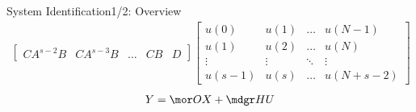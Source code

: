 \begin{frame}{System Identification}{1/2: Overview \ \ \cite{vandenberghe2012convex}}
{\begin{align*}
{\begin{bmatrix}
        CA^{s-2}B & CA^{s-3}B & \hdots & CB & D
    \end{bmatrix}}
    \begin{bmatrix}
        u(0) & u(1) & \hdots & u(N-1)\\
      u(1) & u(2) & \hdots & u(N)\\
      \vdots & \vdots & \ddots & \vdots\\
      u(s-1) & u(s) & \hdots & u(N+s-2)
    \end{bmatrix}
\end{align*}
}%
\begin{align*}
    Y = {\mor O}X + {\mdgr H}U
\end{align*}
\end{frame}{}

